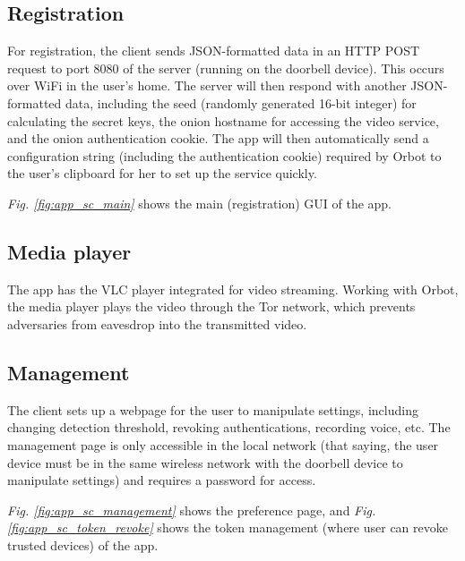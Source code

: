 \subsection{Registration} 
\label{sec:registration}
For registration, the client sends JSON-formatted data in an HTTP POST request to port 8080 of the server (running on the doorbell device). This occurs over WiFi in the user's home. The server will then respond with another JSON-formatted data, including the seed (randomly generated 16-bit integer) for calculating the secret keys, the onion hostname for accessing the video service, and the onion authentication cookie. The app will then automatically send a configuration string (including the authentication cookie) required by Orbot to the user’s clipboard for her to set up the service quickly. 

\textit{Fig. \ref{fig:app_sc_main}} shows the main (registration) GUI of the app.


\subsection{Media player} The app has the VLC player integrated for video streaming. Working with Orbot, the media player plays the video through the Tor network, which prevents adversaries from eavesdrop into the transmitted video.

\subsection{Management} The client sets up a webpage for the user to manipulate settings, including changing detection threshold, revoking authentications, recording voice, etc. The management page is only accessible in the local network (that saying, the user device must be in the same wireless network with the doorbell device to manipulate settings) and requires a password for access.

\textit{Fig. \ref{fig:app_sc_management}} shows the preference page, and \textit{Fig. \ref{fig:app_sc_token_revoke}} shows the token management (where user can revoke trusted devices) of the app.

